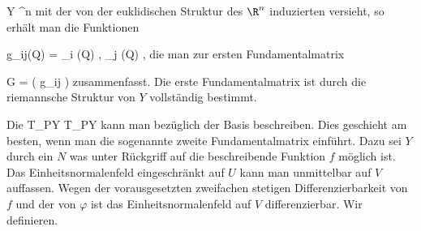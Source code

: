 \mavergleichskette
{\vergleichskette
{ Y
}
{ \subseteq }{ \R^n
}
{  }{
}
{    }{
}
{   }{
}
}
{}{}{}
mit der von der euklidischen Struktur des $\R^n$ induzierten
versieht, so erhält man die Funktionen

\mavergleichskettedisp
{\vergleichskette
{ g_{ij}(Q)
}
{ =} { \left\langle  \partial_i \varphi (Q)   ,  \partial_j \varphi (Q)   \right\rangle
}
{ } {
}
{ } {
}
{ } {
}
}
{}{}{,}
die man zur ersten Fundamentalmatrix
 {} {}

\mavergleichskettedisp
{\vergleichskette
{ G
}
{ =} { \left(  g_{ij}  \right)
}
{ } {
}
{ } {
}
{ } {
}
}
{}{}{}
zusammenfasst. Die erste Fundamentalmatrix ist durch die riemannsche Struktur von $Y$ vollständig bestimmt.

Die
 { T_{P}Y } { T_{P}Y
} {}
kann man bezüglich der Basis
 beschreiben. Dies geschieht am besten, wenn man die sogenannte zweite Fundamentalmatrix einführt. Dazu sei $Y$ durch ein
$N$
was unter Rückgriff auf die beschreibende Funktion $f$ möglich ist. Das Einheitsnormalenfeld eingeschränkt auf $U$ kann man unmittelbar auf $V$ auffassen. Wegen der vorausgesetzten zweifachen stetigen Differenzierbarkeit von $f$ und der von $\varphi$ ist das Einheitsnormalenfeld auf $V$ differenzierbar. Wir definieren.

